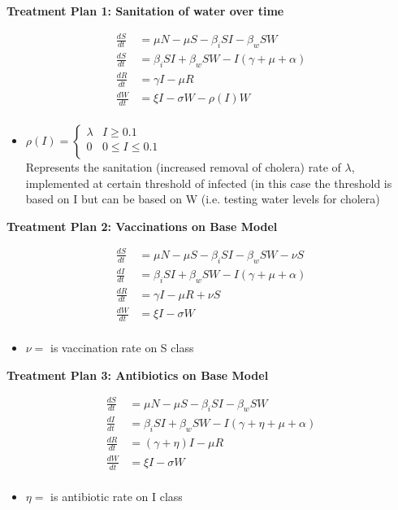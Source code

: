 \documentclass[]{article}
\begin{document}
\textbf{Treatment Plan 1: Sanitation of water over time}

\begin{align*}
	\frac{dS}{dt}&= \mu N - \mu S - \beta_i SI - \beta_w S W  \\
	\frac{dS}{dt}&= \beta_i S I + \beta_w S W - I (\gamma + \mu + \alpha) \\
	\frac{dR}{dt}&= \gamma I - \mu R \\
	\frac{dW}{dt}&= \xi I  - \sigma W - \rho (I) W\\
\end{align*}
	
\begin{itemize}
	\item $\rho (I)= \begin{cases}
			 			\lambda & I \geq 0.1 \\
			 			0 & 0 \leq I \leq 0.1 \\
			 			\end{cases}$\\
	Represents the sanitation (increased removal of cholera) rate of $\lambda$, implemented at certain threshold of infected (in this case the threshold is based on I but can be based on W (i.e. testing water levels for cholera) %
\end{itemize} 	 
		

\textbf{Treatment Plan 2: Vaccinations on Base Model}

\begin{align*}
	\frac{dS}{dt}&= \mu N - \mu S - \beta_i SI - \beta_w S W - \nu S \\
	\frac{dI}{dt}&= \beta_i S I + \beta_w S W - I (\gamma + \mu + \alpha) \\
	\frac{dR}{dt}&= \gamma I - \mu R + \nu S\\
	\frac{dW}{dt}&= \xi I  - \sigma W\\
\end{align*}

\begin{itemize}
	\item $\nu=$ is vaccination rate on S class
\end{itemize} 

\textbf{Treatment Plan 3: Antibiotics on Base Model}

\begin{align*}
	\frac{dS}{dt}&= \mu N - \mu S - \beta_i SI - \beta_w S W \\
	\frac{dI}{dt}&= \beta_i S I + \beta_w S W - I (\gamma +\eta + \mu + \alpha ) \\
	\frac{dR}{dt}&= (\gamma +\eta)I - \mu R \\
	\frac{dW}{dt}&= \xi I  - \sigma W\\
\end{align*}
\begin{itemize}
	\item $\eta=$ is antibiotic rate on I class
\end{itemize} 
\end{document}
